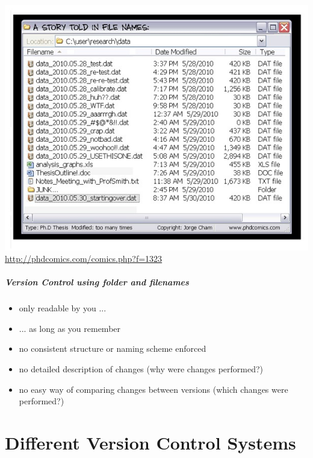 \documentclass[
t, %
10pt, %
aspectratio=1610, %
ngerman,
english,
]{beamer}
\begin{document}
\begin{frame}[label=introduction]
    \centering
    \includegraphics[height=\textheight]{graphics/phd052810s.jpg}\\
    \url{http://phdcomics.com/comics.php?f=1323}
\end{frame}

\begin{frame}[label=introduction]
    \frametitle{Version Control using folder and filenames}
    \begin{itemize}[<+->]
        \item only readable by you ...
        \item ... as long as you remember
        \item no consistent structure or naming scheme enforced
        \item no detailed description of changes (why were changes performed?)
        \item no easy way of comparing changes between versions (which changes were performed?)
    \end{itemize}
\end{frame}

\part{Different Version Control Systems}
\makepart

\begin{frame}
    \
\end{frame}
\end{document}
